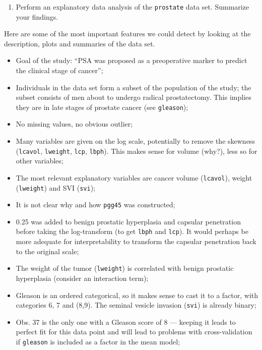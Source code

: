\documentclass[]{book}
\providecommand{\tightlist}{%
  \setlength{\itemsep}{0pt}\setlength{\parskip}{0pt}}
\theoremstyle{definition}
\theoremstyle{definition}
\theoremstyle{definition}
\theoremstyle{remark}
\begin{document}
\begin{enumerate}
\def\labelenumi{\alph{enumi}.}
\setcounter{enumi}{9}
\tightlist
\item
  Perform an explanatory data analysis of the \texttt{prostate} data set. Summarize your findings.
\end{enumerate}

Here are some of the most important features we could detect by looking at the description, plots and summaries of the data set.

\begin{itemize}
\tightlist
\item
  Goal of the study: ``PSA was proposed as a preoperative marker to predict the clinical stage of cancer'';
\item
  Individuals in the data set form a subset of the population of the study; the subset consists of men about to undergo radical prostatectomy. This implies they are in late stages of prostate cancer (see \texttt{gleason});
\item
  No missing values, no obvious outlier;
\item
  Many variables are given on the log scale, potentially to remove the skewness (\texttt{lcavol}, \texttt{lweight}, \texttt{lcp}, \texttt{lbph}). This makes sense for volume (why?), less so for other variables;
\item
  The most relevant explanatory variables are cancer volume (\texttt{lcavol}), weight (\texttt{lweight}) and SVI (\texttt{svi});
\item
  It is not clear why and how \texttt{pgg45} was constructed;
\item
  0.25 was added to benign prostatic hyperplasia and capsular penetration before taking the log-transform (to get \texttt{lbph} and \texttt{lcp}). It would perhaps be more adequate for interpretability to transform the capsular penetration back to the original scale;
\item
  The weight of the tumor (\texttt{lweight}) is correlated with benign prostatic hyperplasia (consider an interaction term);
\item
  Gleason is an ordered categorical, so it makes sense to cast it to a factor, with categories 6, 7 and (8,9). The seminal vesicle invasion (\texttt{svi}) is already binary;
\item
  Obs. 37 is the only one with a Gleason score of 8 --- keeping it leads to perfect fit for this data point and will lead to problems with cross-validation if \texttt{gleason} is included as a factor in the mean model;
\end{itemize}
\end{document}
